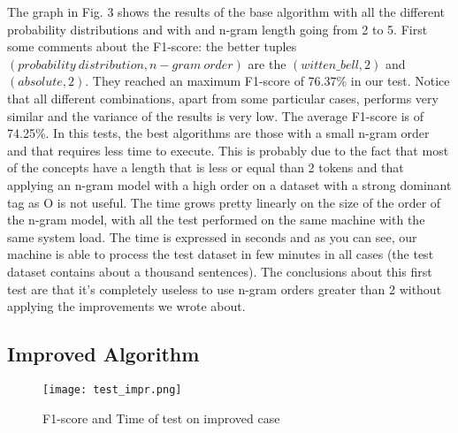 \documentclass[11pt,a4paper]{article}
\begin{document}
The graph in Fig. 3 shows the results of the base algorithm with all the different probability distributions and with and n-gram length going from 2 to 5. First some comments about the F1-score: the better tuples $(probability\ distribution, n-gram\ order)$ are the $(witten\_bell,2)$ and $(absolute,2)$. They reached an maximum F1-score of 76.37\% in our test. Notice that all different combinations, apart from some particular cases, performs very similar and the variance of the results is very low. The average F1-score is of 74.25\%. In this tests, the best algorithms are those with a small n-gram order and that requires less time to execute. This is probably due to the fact that most of the concepts have a length that is less or equal than 2 tokens and that applying an n-gram model with a high order on a dataset with a strong dominant tag as O is not useful.
The time grows pretty linearly on the size of the order of the n-gram model, with all the test performed on the same machine with the same system load. The time is expressed in seconds and as you can see, our machine is able to process the test dataset in few minutes in all cases (the test dataset contains about a thousand sentences). The conclusions about this first test are that it's completely useless to use n-gram orders greater than 2 without applying the improvements we wrote about.

\subsection{Improved Algorithm}

\begin{figure*}
  \texttt{[image: test\_impr.png]}
  \caption{F1-score and Time of test on improved case}
\end{figure*}
\end{document}
